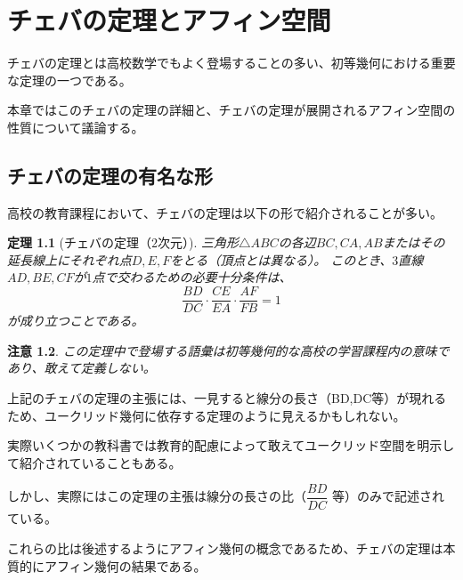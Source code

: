 \documentclass[a4paper,12pt]{bxjsbook}
\newlength{\customindent}
\newenvironment{body}{
  \par
  \begingroup
  \setlength{\leftskip}{\customindent}
  \setlength{\rightskip}{0pt}
  \setlength{\parindent}{1em}
  \setlength{\displayindent}{\customindent}
  \setlength{\displaywidth}{\dimexpr\linewidth-\customindent\relax}
}{
  \par
  \endgroup
}
\theoremstyle{theorem}
\newtheorem{theorem}{定理}[chapter]
\newtheorem{remark}[theorem]{注意}
\begin{document}
    \begin{body}

    \end{body}

    \chapter{チェバの定理とアフィン空間}
    \begin{body}
      \indent チェバの定理とは高校数学でもよく登場することの多い、初等幾何における重要な定理の一つである。

      \indent 本章ではこのチェバの定理の詳細と、チェバの定理が展開されるアフィン空間の性質について議論する。
    
    \end{body}

    \section{チェバの定理の有名な形}

    \begin{body}
      \indent 高校の教育課程において、チェバの定理は以下の形で紹介されることが多い。
    \end{body}

    \begin{theorem}[チェバの定理（$2$次元）]
        三角形$\triangle ABC$の各辺$BC, CA, AB$またはその延長線上にそれぞれ点$D, E, F$をとる（頂点とは異なる）。
        このとき、$3$直線$AD, BE, CF$が$1$点で交わるための必要十分条件は、
        \[
            \frac{BD}{DC} \cdot \frac{CE}{EA} \cdot \frac{AF}{FB} = 1
        \]
        が成り立つことである。
    \end{theorem}

    \begin{remark}
      この定理中で登場する語彙は初等幾何的な高校の学習課程内の意味であり、敢えて定義しない。
    \end{remark}
    
    \begin{body}
      \indent 上記のチェバの定理の主張には、一見すると線分の長さ（BD,DC等）が現れるため、ユークリッド幾何に依存する定理のように見えるかもしれない。

      \indent 実際いくつかの教科書では教育的配慮によって敢えてユークリッド空間を明示して紹介されていることもある。

      \indent しかし、実際にはこの定理の主張は線分の長さの比（$\dfrac{BD}{DC}$ 等）のみで記述されている。

      \indent これらの比は後述するようにアフィン幾何の概念であるため、チェバの定理は本質的にアフィン幾何の結果である。
    \end{body}
\end{document}
